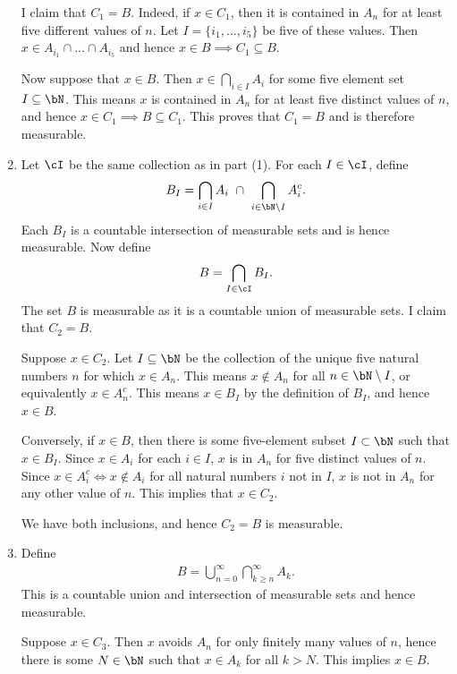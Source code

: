 \begin{homework}[e]
\begin{prf}
\begin{enumerate}[(1)]
				I claim that $C_1 = B$. Indeed, if $x \in C_1$, then it is contained in $A_n$ for at least five different values of $n$. Let $I = \{i_1,...,i_5\}$ be five of these values. Then $x \in A_{i_1}\cap ... \cap A_{i_5}$ and hence $x \in B \implies C_1 \subseteq B$.

				Now suppose that $x \in B$. Then $x \in \bigcap_{i \in I} A_i$ for some five element set $I\subseteq \bN$. This means $x$ is contained in $A_n$ for at least five distinct values of $n$, and hence $x \in C_1\implies B \subseteq C_1$. This proves that $C_1 = B$ and is therefore measurable.

			\item Let $\cI$ be the same collection as in part (1). For each $I \in \cI$, define
				\begin{align*}
					B_I = \bigcap_{i\in I} A_i ~ \cap ~ \bigcap_{i \in \bN \setminus I} A_i^c.
				\end{align*}
				Each $B_I$ is a countable intersection of measurable sets and is hence measurable. Now define
				\begin{align*}
					B = \bigcap_{I \in \cI} B_I.
				\end{align*}
				The set $B$ is measurable as it is a countable union of measurable sets. I claim that $C_2 = B$.

				Suppose $x \in C_2$. Let $I\subseteq \bN$ be the collection of the unique five natural numbers $n$ for which $x \in A_n$. This means $x \not \in A_n$ for all $n \in \bN \setminus I$, or equivalently $x \in A_n^c$. This means $x \in B_I$ by the definition of $B_I$, and hence $x \in B$.

				Conversely, if $x \in B$, then there is some five-element subset $I \subset \bN$ such that $x \in B_I$. Since $x \in A_i$ for each $i \in I$, $x$ is in $A_n$ for five distinct values of $n.$ Since $x \in A_i^c \iff x \not\in A_i$ for all natural numbers $i$ not in $I$, $x$ is not in $A_n$ for any other value of $n$. This implies that $x \in C_2$.

				We have both inclusions, and hence $C_2 = B$ is measurable.

			\item Define
				\begin{align*}
					B = \bigcup_{n = 0}^\infty \bigcap_{k \geq n}^\infty A_k.
				\end{align*}
				This is a countable union and intersection of measurable sets and hence measurable.

				Suppose $x \in C_3$. Then $x$ avoids $A_n$ for only finitely many values of $n$, hence there is some $N \in \bN$ such that $x \in A_k$ for all $k > N$. This implies $x \in B$.


\end{enumerate}
\end{prf}
\end{homework}
